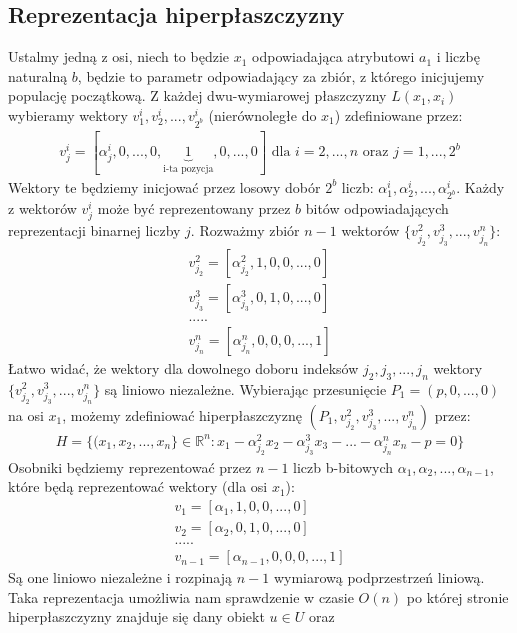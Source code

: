 \documentclass[magisterska]{pracamgr}
\theoremstyle{plain}
\theoremstyle{definition}
\theoremstyle{remark}
\begin{document}
\subsection{Reprezentacja hiperpłaszczyzny}
Ustalmy jedną z osi, niech to będzie $x_1$ odpowiadająca atrybutowi $a_1$ i liczbę naturalną $b$, będzie to parametr odpowiadający
za zbiór, z którego inicjujemy populację początkową. Z każdej dwu-wymiarowej płaszczyzny $L(x_1, x_i)$ wybieramy wektory 
$v_1^i, v_2^i, ..., v_{2^b}^i$ (nierównoległe do $x_1$) zdefiniowane przez:
\begin{align*}
v_j^i = [\alpha_j^i, 0, ..., 0, \underbrace{1}_{\text{i-ta pozycja}} , 0, ..., 0] \text{ dla } i=2, ..., n \text{ oraz } j=1, ..., 2^b 
\end{align*}
Wektory te będziemy inicjować przez losowy dobór $2^b$ liczb: $\alpha_1^i, \alpha_2^i, ..., \alpha_{2^b}^i$.
Każdy z wektorów $v_j^i$ może być reprezentowany przez $b$ bitów odpowiadających reprezentacji
binarnej liczby $j$. Rozważmy zbiór $n-1$ wektorów $\{v_{j_2}^2, v_{j_3}^3, ..., v_{j_n}^n\}$:
\begin{align*}
 v_{j_2}^2 = [\alpha_{j_2}^2, 1, 0, 0,  ..., 0] \\
 v_{j_3}^3 = [\alpha_{j_3}^3, 0, 1, 0,  ..., 0] \\
 ..... \\
 v_{j_n}^n = [\alpha_{j_n}^n, 0, 0, 0,  ..., 1]
\end{align*}
Łatwo widać, że wektory dla dowolnego doboru indeksów $j_2, j_3, ..., j_n$ wektory $\{v_{j_2}^2, v_{j_3}^3, ..., v_{j_n}^n\}$ 
są liniowo niezależne. Wybierając przesunięcie $P_1 = (p, 0, ..., 0)$ na osi $x_1$, możemy zdefiniować 
hiperpłaszczyznę $(P_1, v_{j_2}^2, v_{j_3}^3, ..., v_{j_n}^n)$ przez:
\begin{align*}
 H = \{(x_1, x_2, ..., x_n\} \in \mathbb{R}^n : x_1 - \alpha_{j_2}^2 x_2 - \alpha_{j_3}^3 x_3 - ... - \alpha_{j_n}^n x_n - p = 0\}
\end{align*}
Osobniki będziemy reprezentować przez $n-1$ liczb b-bitowych $\alpha_1, \alpha_2, ..., \alpha_{n-1}$, które będą 
reprezentować wektory (dla osi $x_1$):
\begin{align*}
 v_1 = [\alpha_1, 1, 0, 0,  ..., 0] \\
 v_2 = [\alpha_2, 0, 1, 0,  ..., 0] \\
 ..... \\
 v_{n-1} = [\alpha_{n-1}, 0, 0, 0,  ..., 1]
\end{align*}
Są one liniowo niezależne i rozpinają $n-1$ wymiarową podprzestrzeń liniową.
Taka reprezentacja umożliwia nam sprawdzenie w czasie $O(n)$ po której stronie hiperpłaszczyzny znajduje się dany obiekt $u \in U$ oraz 
\end{document}
